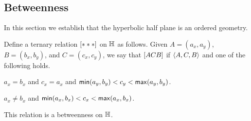 \subsection*{Betweenness}

In this section we establish that the hyperbolic half plane is an ordered geometry.

\begin{prop}
Define a ternary relation \([ \ast \ast \ast ]\) on \(\mathbb{H}\) as follows.
Given \(A = (a_x, a_y)\), \(B = (b_x, b_y)\), and \(C = (c_x, c_y)\), we say that \([ A C B ]\) if \(\langle A, C, B \rangle\) and one of the following holds.
\begin{proplist}
\item \(a_x = b_x\) and \(c_x = a_x\) and \(\mathsf{min}(a_y,b_y) < c_y < \mathsf{max}(a_y,b_y)\).
\item \(a_x \neq b_x\) and \(\mathsf{min}(a_x,b_x) < c_x < \mathsf{max}(a_x,b_x)\).
\end{proplist}
This relation is a betweenness on \(\mathbb{H}\).
\end{prop}

